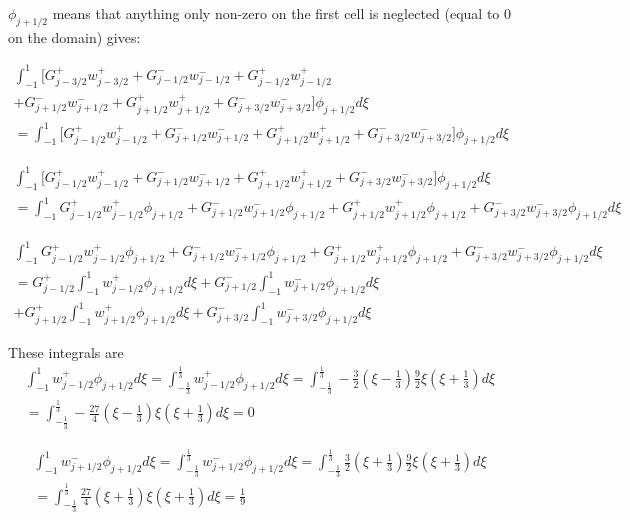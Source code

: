 \documentclass[12pt]{article}
\begin{document}
$\phi_{j + 1/2}$ means that anything only non-zero on the first cell is neglected (equal to 0 on the domain) gives:

\begin{multline*}
\int_{-1}^{1}\bigg[G^+_{j - 3/2}w^+_{j - 3/2} + G^-_{j - 1/2}w^-_{j - 1/2} + G^+_{j - 1/2}w^+_{j - 1/2} \\+ G^-_{j + 1/2}w^-_{j + 1/2} + G^+_{j + 1/2}w^+_{j + 1/2} + G^-_{j + 3/2}w^-_{j + 3/2}\bigg] \phi_{j+ 1/2} d\xi \\ = \int_{-1}^{1}\bigg[G^+_{j - 1/2}w^+_{j - 1/2} + G^-_{j + 1/2}w^-_{j + 1/2} + G^+_{j + 1/2}w^+_{j + 1/2} + G^-_{j + 3/2}w^-_{j + 3/2}\bigg] \phi_{j+ 1/2} d\xi
\end{multline*}

\begin{multline*}
\int_{-1}^{1}\bigg[G^+_{j - 1/2}w^+_{j - 1/2} + G^-_{j + 1/2}w^-_{j + 1/2} + G^+_{j + 1/2}w^+_{j + 1/2} + G^-_{j + 3/2}w^-_{j + 3/2}\bigg] \phi_{j+ 1/2} d\xi \\ =
\int_{-1}^{1}G^+_{j - 1/2}w^+_{j - 1/2}\phi_{j+ 1/2} + G^-_{j + 1/2}w^-_{j + 1/2}\phi_{j+ 1/2} + G^+_{j + 1/2}w^+_{j + 1/2}\phi_{j+ 1/2} + G^-_{j + 3/2}w^-_{j + 3/2}\phi_{j+ 1/2}  d\xi
\end{multline*}

\begin{multline*}
\int_{-1}^{1}G^+_{j - 1/2}w^+_{j - 1/2}\phi_{j+ 1/2} + G^-_{j + 1/2}w^-_{j + 1/2}\phi_{j+ 1/2} + G^+_{j + 1/2}w^+_{j + 1/2}\phi_{j+ 1/2} + G^-_{j + 3/2}w^-_{j + 3/2}\phi_{j+ 1/2}  d\xi \\ = G^+_{j - 1/2} \int_{-1}^{1}w^+_{j - 1/2}\phi_{j+ 1/2} d\xi + G^-_{j + 1/2} \int_{-1}^{1}w^-_{j + 1/2}\phi_{j+ 1/2}  d\xi \\+ G^+_{j + 1/2} \int_{-1}^{1}w^+_{j + 1/2}\phi_{j+ 1/2} d\xi + G^-_{j + 3/2} \int_{-1}^{1}w^-_{j + 3/2}\phi_{j+ 1/2}  d\xi
\end{multline*}

These integrals are
\begin{multline*}
\int_{-1}^{1}w^+_{j - 1/2}\phi_{j+ 1/2} d\xi = \int_{-\frac{1}{3}}^{\frac{1}{3}}w^+_{j - 1/2}\phi_{j+ 1/2} d\xi = \int_{-\frac{1}{3}}^{\frac{1}{3}} -\frac{3}{2}\left(\xi - \frac{1}{3}\right)\frac{9}{2}\xi \left(\xi + \frac{1}{3}\right) d\xi \\ =
\int_{-\frac{1}{3}}^{\frac{1}{3}} -\frac{27}{4}\left(\xi - \frac{1}{3}\right)\xi \left(\xi + \frac{1}{3}\right) d\xi = 0
\end{multline*}

\begin{multline*}
\int_{-1}^{1}w^-_{j + 1/2}\phi_{j+ 1/2} d\xi = \int_{-\frac{1}{3}}^{\frac{1}{3}}w^-_{j + 1/2}\phi_{j+ 1/2} d\xi = \int_{-\frac{1}{3}}^{\frac{1}{3}} \frac{3}{2}\left(\xi + \frac{1}{3}\right)\frac{9}{2}\xi \left(\xi + \frac{1}{3}\right) d\xi \\ = \int_{-\frac{1}{3}}^{\frac{1}{3}} \frac{27}{4}\left(\xi + \frac{1}{3}\right)\xi \left(\xi + \frac{1}{3}\right) d\xi = \frac{1}{9}
\end{multline*}
\end{document}
